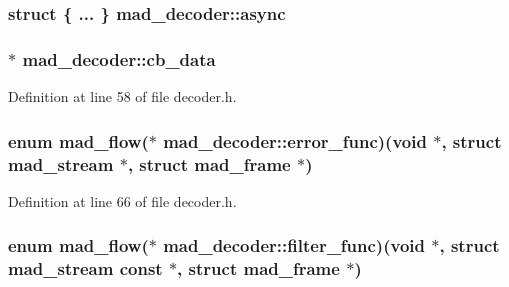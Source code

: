 \subsubsection[{\texorpdfstring{async}{async}}]{\setlength{\rightskip}{0pt plus 5cm}struct \{ ... \}   mad\+\_\+decoder\+::async}\hypertarget{structmad__decoder_a4b686e62b226cd29c4a19c2441af3430}{}\label{structmad__decoder_a4b686e62b226cd29c4a19c2441af3430}
\subsubsection[{\texorpdfstring{cb\+\_\+data}{cb_data}}]{ $\ast$ mad\+\_\+decoder\+::cb\+\_\+data}\hypertarget{structmad__decoder_a7394a68adf1e161ea618ca1e7295bd5e}{}\label{structmad__decoder_a7394a68adf1e161ea618ca1e7295bd5e}


Definition at line 58 of file decoder.\+h.

\subsubsection[{\texorpdfstring{error\+\_\+func}{error_func}}]{\setlength{\rightskip}{0pt plus 5cm}enum {\bf mad\+\_\+flow}($\ast$ mad\+\_\+decoder\+::error\+\_\+func)({\bf void} $\ast$, struct {\bf mad\+\_\+stream} $\ast$, struct {\bf mad\+\_\+frame} $\ast$)}\hypertarget{structmad__decoder_aad0550e4516e52a1b59a5d2d95ebe3d9}{}\label{structmad__decoder_aad0550e4516e52a1b59a5d2d95ebe3d9}


Definition at line 66 of file decoder.\+h.

\subsubsection[{\texorpdfstring{filter\+\_\+func}{filter_func}}]{\setlength{\rightskip}{0pt plus 5cm}enum {\bf mad\+\_\+flow}($\ast$ mad\+\_\+decoder\+::filter\+\_\+func)({\bf void} $\ast$, struct {\bf mad\+\_\+stream} {\bf const} $\ast$, struct {\bf mad\+\_\+frame} $\ast$)}\hypertarget{structmad__decoder_ab2c40d16b6339ff1ad4c4142069c3597}{}\label{structmad__decoder_ab2c40d16b6339ff1ad4c4142069c3597}



